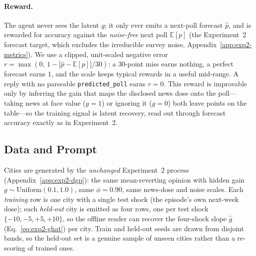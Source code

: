 \documentclass{article} %
\begin{document}
\paragraph{Reward.}  The agent never sees the latent $g$; it only ever emits a next-poll forecast
$\hat p$, and is rewarded for accuracy against the \emph{noise-free} next poll $\mathbb E[p]$ (the
Experiment~2 forecast target, which excludes the irreducible survey noise, Appendix~\ref{app:exp2-metrics}).
We use a clipped, unit-scaled negative error $r=\max(0,\,1-|\hat p-\mathbb E[p]|/30)$: a $30$-point
miss earns nothing, a perfect forecast earns $1$, and the scale keeps typical rewards in a useful
mid-range.  A reply with no parseable \texttt{predicted\_poll} earns $r{=}0$.  This reward is
improvable only by inferring the gain that maps the disclosed news dose onto the poll---taking news at
face value ($g{=}1$) or ignoring it ($g{=}0$) both leave points on the table---so the training signal
is latent recovery, read out through forecast accuracy exactly as in Experiment~2.

\subsection{Data and Prompt}
\label{app:exp3-data}

Cities are generated by the \emph{unchanged} Experiment~2 process (Appendix~\ref{app:exp2-dgp}): the
same mean-reverting opinion with hidden gain $g\sim\mathrm{Uniform}(0.1,1.0)$, same $\phi{=}0.90$, same
news-dose and noise scales.  Each \emph{training} row is one city with a single test shock (the
episode's own next-week dose); each \emph{held-out} city is emitted as four rows, one per test shock
$\{-10,-5,+5,+10\}$, so the offline reader can recover the four-shock slope $\hat g$
(Eq.~\eqref{eq:exp2-ghat}) per city.  Train and held-out seeds are drawn from disjoint bands, so the
held-out set is a genuine sample of unseen cities rather than a re-scoring of trained ones.
\end{document}
